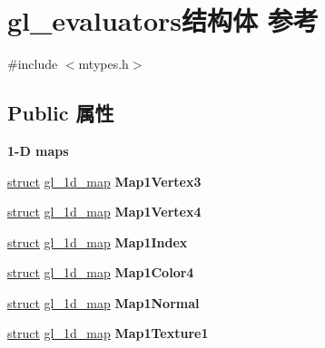 \hypertarget{structgl__evaluators}{}\section{gl\+\_\+evaluators结构体 参考}
\label{structgl__evaluators}


{\ttfamily \#include $<$mtypes.\+h$>$}

\subsection*{Public 属性}
\begin{Indent}\textbf{ 1-\/D maps}\par
\begin{DoxyCompactItemize}
\item 
\mbox{\label{structgl__evaluators_af8f2a31c10534d16a5c2debc5879ac21}} 
\hyperlink{interfacestruct}{struct} \hyperlink{structgl__1d__map}{gl\+\_\+1d\+\_\+map} {\bfseries Map1\+Vertex3}
\item 
\mbox{\label{structgl__evaluators_a5f3a8f50b2363e960048a5dc813426c3}} 
\hyperlink{interfacestruct}{struct} \hyperlink{structgl__1d__map}{gl\+\_\+1d\+\_\+map} {\bfseries Map1\+Vertex4}
\item 
\mbox{\label{structgl__evaluators_a8081c7fc09d890f1cb5e596f8c925fc0}} 
\hyperlink{interfacestruct}{struct} \hyperlink{structgl__1d__map}{gl\+\_\+1d\+\_\+map} {\bfseries Map1\+Index}
\item 
\mbox{\label{structgl__evaluators_a134e9d20343e54719b585dcb886073e9}} 
\hyperlink{interfacestruct}{struct} \hyperlink{structgl__1d__map}{gl\+\_\+1d\+\_\+map} {\bfseries Map1\+Color4}
\item 
\mbox{\label{structgl__evaluators_a1307a713e013adb40d18bd0d2ebf2dce}} 
\hyperlink{interfacestruct}{struct} \hyperlink{structgl__1d__map}{gl\+\_\+1d\+\_\+map} {\bfseries Map1\+Normal}
\item 
\mbox{\label{structgl__evaluators_a87b3c6f5f6a758fbbb3ff7bf86576de4}} 
\hyperlink{interfacestruct}{struct} \hyperlink{structgl__1d__map}{gl\+\_\+1d\+\_\+map} {\bfseries Map1\+Texture1}
\item 

\end{DoxyCompactItemize}
\end{Indent}
